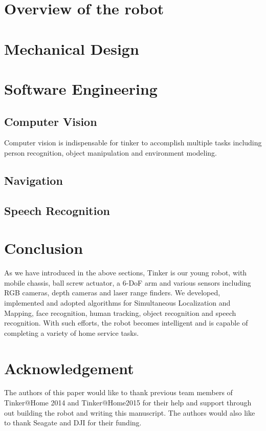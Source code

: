 \documentclass[runningheads,a4paper]{llncs}
\begin{document}
\section{Overview of the robot}



\section{Mechanical Design}


\section{Software Engineering}
\subsection{Computer Vision}
Computer vision is indispensable for tinker to accomplish multiple tasks including person recognition, object manipulation and environment modeling.


\subsection{Navigation}


\subsection{Speech Recognition}




\section{Conclusion}

As we have introduced in the above sections, Tinker is our young robot, with mobile chassis, ball screw actuator, a 6-DoF arm and various sensors including RGB cameras, depth cameras and laser range finders. We developed, implemented and adopted algorithms for Simultaneous Localization and Mapping, face recognition, human tracking, object recognition and speech recognition. With such efforts, the robot becomes intelligent and is capable of completing a variety of home service tasks. 



\section*{Acknowledgement}
The authors of this paper would like to thank previous team members of Tinker@Home 2014 and Tinker@Home2015 for their help and support through out building the robot and writing this manuscript. The authors would also like to thank Seagate and DJI for their funding. 



\end{document}
